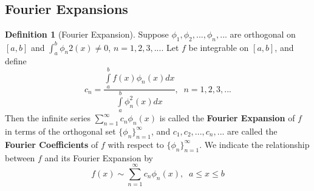 \documentclass[12pt]{article}
\theoremstyle{definition}
\newtheorem{defn}[thm]{Definition}
\theoremstyle{remark}
\numberwithin{equation}{section}
\newcommand\B[1]{\textbf{ #1}}
\begin{document}
\vspace{1cm}


\subsection{Fourier Expansions}

\begin{defn}[Fourier Expansion]
        Suppose $\phi_1,\phi_2,...,\phi_n,...$ are orthogonal on $[a,b]$ and $\int_a^b\phi_n2(x)\neq 0$, $n=1,2,3,...$. Let $f$ be integrable on $[a,b]$, and define \begin{equation}
                c_n = \frac{\int\limits_a^bf(x)\phi_n(x)dx}{\int\limits_a^b\phi_n^2(x)dx},\;\;n=1,2,3,...
        \end{equation}
        Then the infinite series $\sum_{n=1}^{\infty}c_n\phi_n(x)$ is called the \B{Fourier Expansion} of $f$ in terms of the orthogonal set $\{\phi_n\}_{n=1}^{\infty}$, and $c_1,c_2,...,c_n,...$ are called the \B{Fourier Coefficients} of $f$ with respect to $\{\phi_n\}_{n=1}^{\infty}$. We indicate the relationship between $f$ and its Fourier Expansion by \begin{equation}
                f(x) \sim \sum\limits_{n=1}^{\infty}c_n\phi_n(x),\;\;a\leq x\leq b
        \end{equation}
\end{defn}


\vspace{1cm}
\end{document}
